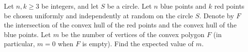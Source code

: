 Let \(n,k\ge 3\) be integers, and let \(S\) be a circle. Let \(n\) blue points and \(k\) red points be chosen uniformly and independently at random on the circle \(S\). Denote by \(F\) the intersection of the convex hull of the red points and the convex hull of the blue points. Let \(m\) be the number of vertices of the convex polygon \(F\) (in particular, \(m=0\) when \(F\) is empty). Find the expected value of \(m\).